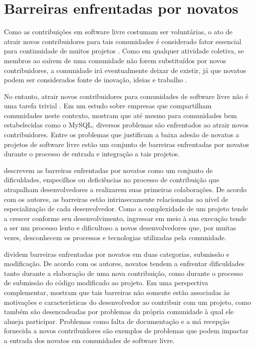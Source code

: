 \section{Barreiras enfrentadas por novatos}
\label{cap:newcomers-barriers}
Como as contribuições em software livre costumam ser voluntárias, o ato de atrair novos contribuidores para tais comunidades é considerado fator essencial para continuidade de muitos projetos \citep{qureshi2011socialization}. Como em qualquer atividade coletiva, se membros ao saírem de uma comunidade não forem substituídos por novos contribuidores, a comunidade irá eventualmente deixar de existir, já que novatos podem ser considerados fonte de inovação, ideias e trabalho \citep{kraut2012challenges}. 

No entanto, atrair novos contribuidores para comunidades de software livre não é uma tarefa trivial \citep{zhou2015whowill}. Em um estudo sobre empresas que compartilham comunidades neste contexto, \citet{dahlander2008how} mostram que até mesmo para comunidades bem estabelecidas como o MySQL, diversos problemas são enfrentados ao atrair novos contribuidores. Entre os problemas que justificam a baixa adesão de novatos a projetos de software livre estão um conjunto de barreiras enfrentadas por novatos durante o processo de entrada e integração a tais projetos. 

\citet{von2003community} descrevem as barreiras enfrentadas por novatos como um conjunto de dificuldades, empecilhos ou deficiências no processo de contribuição que atrapalham desenvolvedores a realizarem suas primeiras colaborações. De acordo com os autores, as barreiras estão intrinsecamente relacionadas ao nível de especialização de cada desenvolvedor. Como a complexidade de um projeto tende a crescer conforme seu desenvolvimento, ingressar em meio à sua execução tende a ser um processo lento e dificultoso a novos desenvolvedores que, por muitas vezes, desconhecem os processos e tecnologias utilizadas pela comunidade.

\citet{hannebauer2017relationship} dividem barreiras enfrentadas por novatos em duas categorias, submissão e modificação. De acordo com os autores, novatos tendem a enfrentar dificuldades tanto durante a elaboração de uma nova contribuição, como durante o processo de submissão do código modificado ao projeto. Em uma perspectiva complementar, \citet{steinmacher2014thehard} mostram que tais barreiras não somente estão associadas às motivações e características do desenvolvedor ao contribuir com um projeto, como também são desencadeadas por problemas da própria comunidade à qual ele almeja participar. Problemas como falta de documentação e a má recepção fornecida a novos contribuidores são exemplos de problemas que podem impactar a entrada dos novatos em comunidades de software livre.

